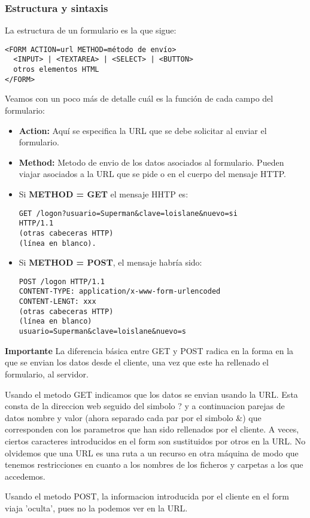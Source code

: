 \documentclass{apuntes}
\begin{document}
\subsubsection{Estructura y sintaxis}
La estructura de un formulario es la que sigue:
\begin{verbatim}
<FORM ACTION=url METHOD=método de envío>
  <INPUT> | <TEXTAREA> | <SELECT> | <BUTTON>
  otros elementos HTML
</FORM>
\end{verbatim}

Veamos con un poco más de detalle cuál es la función de cada campo del formulario:
\begin{itemize}
\item \textbf{Action:} Aquí se especifica la URL que se debe solicitar al enviar el formulario.
\item \textbf{Method:} Metodo de envio de los datos asociados al formulario. Pueden viajar asociados a la URL que se pide o en el cuerpo del mensaje HTTP.
\item Si \textbf{METHOD = GET} el mensaje HHTP es:
\begin{verbatim}
GET /logon?usuario=Superman&clave=loislane&nuevo=si
HTTP/1.1
(otras cabeceras HTTP)
(línea en blanco).
\end{verbatim}
\newpage
\item Si \textbf{METHOD = POST}, el mensaje habría sido:
\begin{verbatim}
POST /logon HTTP/1.1
CONTENT-TYPE: application/x-www-form-urlencoded
CONTENT-LENGT: xxx
(otras cabeceras HTTP)
(línea en blanco)
usuario=Superman&clave=loislane&nuevo=s
\end{verbatim}
\end{itemize}
\textbf{Importante} La diferencia básica entre GET y POST radica en la forma en la que se envian los datos desde el cliente, una vez que este ha rellenado el formulario, al servidor.

Usando el metodo GET indicamos que los datos se envian usando la URL. Esta consta de la direccion web seguido del simbolo ? y a continuacion parejas de datos nombre y valor (ahora separado cada par por el simbolo \&) que corresponden con los parametros que han sido rellenados por el cliente. A veces, ciertos caracteres introducidos en el form son sustituidos por otros en la URL. No olvidemos que una URL es una ruta a un recurso en otra máquina de modo que tenemos restricciones en cuanto a los nombres de los ficheros y carpetas a los que accedemos.

Usando el metodo POST, la informacion introducida por el cliente en el form viaja 'oculta', pues no la podemos ver en la URL.
\end{document}
